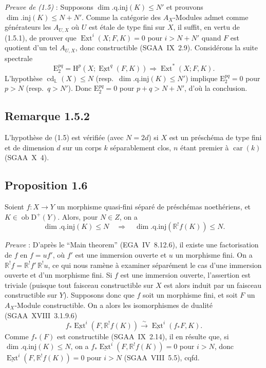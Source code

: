 \documentclass[11pt]{article}
\renewcommand{\H}{\mathrm{H}}
\DeclareMathOperator{\Ext}{Ext}
\DeclareMathOperator{\cd}{cd}
\newcommand{\R}{\mathbb{R}}\newcommand{\RHomCore}{\mathbb{R}\mathrm{Hom}}
\newcommand{\D}{\mathrm{D}}
\newcommand{\E}{\mathrm{E}}
\newcommand{\ob}{\operatorname{ob}}
\newcommand{\car}{\operatorname{car}}
\providecommand{\car}{\operatorname{car}}
\providecommand{\ob}{\operatorname{ob}}
\providecommand{\car}{\operatorname{car}}
\providecommand{\R}{\mathrm R}
\providecommand{\car}{\operatorname{car}}
\begin{document}
\emph{Preuve de (1.5)} : Supposons $\dim.\mathrm{q.inj}(K) \leqslant N'$ et prouvons $\dim.\mathrm{inj}(K) \leqslant N + N'$. Comme la catégorie des $A_X$-Modules admet comme générateurs les $A_{U,X}$ où $U$ est étale de type fini sur $X$, il suffit, en vertu de (1.5.1), de prouver que $\Ext^i(X; F,K) = 0$ pour $i > N + N'$ quand $F$ est quotient d'un tel $A_{U,X}$, donc constructible (SGAA~IX~2.9). Considérons la suite spectrale
\[
\E_2^{pq} = \H^p(X; \underline{\Ext}^q(F,K)) \Rightarrow \Ext^{*}(X; F,K).
\]
L'hypothèse $\cd_{\mathbb{L}}(X) \leqslant N$ (resp.~$\dim.\mathrm{q.inj}(K) \leqslant N'$) implique $\E_2^{pq} = 0$ pour $p > N$ (resp.~$q > N'$). Donc $\E_2^{pq} = 0$ pour $p+q > N+N'$, d'où la conclusion.

\subsection*{Remarque 1.5.2}
L'hypothèse de (1.5) est vérifiée (avec $N = 2d$) si $X$ est un préschéma de type fini et de dimension $d$ sur un corps $k$ séparablement clos, $n$ étant premier à $\car(k)$ (SGAA~X~4).

\subsection*{Proposition 1.6}
Soient $f : X \to Y$ un morphisme quasi-fini séparé de préschémas noethériens, et $K \in \ob \D^{+}(Y)$. Alors, pour $N \in Z$, on a
\[
\dim.\mathrm{q.inj}(K) \leqslant N \quad \Longrightarrow \quad \dim.\mathrm{q.inj}(\R^{!}f(K)) \leqslant N.
\]

\emph{Preuve} : D'après le ``Main theorem'' (EGA~IV~8.12.6), il existe une factorisation de $f$ en $f = uf'$, où $f'$ est une immersion ouverte et $u$ un morphisme fini. On a $\R^{!}f = \R^{!}f' \, \R^{!}u$, ce qui nous ramène à examiner séparément le cas d'une immersion ouverte et d'un morphisme fini. Si $f$ est une immersion ouverte, l'assertion est triviale (puisque tout faisceau constructible sur $X$ est alors induit par un faisceau constructible sur $Y$). Supposons donc que $f$ soit un morphisme fini, et soit $F$ un $A_X$-Module constructible. On a alors les isomorphismes de dualité (SGAA~XVIII~3.1.9.6)
\[
f_{*}\underline{\Ext}^i(F, \R^{!}f(K)) \xrightarrow{\sim} \underline{\Ext}^i(f_{*}F, K).
\]
Comme $f_{*}(F)$ est constructible (SGAA~IX~2.14), il en résulte que, si $\dim.\mathrm{q.inj}(K) \leqslant N$, on a $f_{*}\underline{\Ext}^i(F, \R^{!}f(K)) = 0$ pour $i > N$, donc $\underline{\Ext}^i(F, \R^{!}f(K)) = 0$ pour $i > N$ (SGAA~VIII~5.5), cqfd.
\end{document}
